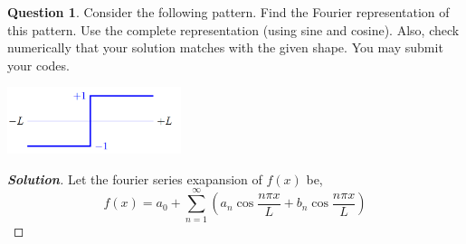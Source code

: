 \documentclass[10pt]{scrartcl}
\theoremstyle{definition}
\newtheorem{exercise}{Question}
\newenvironment{solution} {\begin{proof}[\normalfont \textbf{Solution}]} {\end{proof}}
\begin{document}
\begin{exercise}
    Consider the following pattern. Find the Fourier representation of this pattern. Use the
    complete representation (using sine and cosine). Also, check numerically that your solution
    matches with the given shape. You may submit your codes.

    \includegraphics[width = 2.0in]{q3.png}
\end{exercise}
\begin{solution}
    Let the fourier series exapansion of $f(x)$ be, $$f(x) = a_0 + \sum_{n=1}^{\infty}\left(a_n \cos \frac{n\pi x}{L} + b_n \cos \frac{n\pi x}{L}\right)$$


\end{solution}
\end{document}
